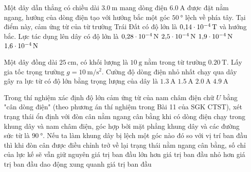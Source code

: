 \begin{ex}
	Một dây dẫn thẳng có chiều dài $\SI{3.0}{\meter}$ mang dòng điện $\SI{6.0}{\ampere}$ được đặt nằm ngang, hướng của dòng điện tạo với hướng bắc một góc $\SI{50}{\degree}$ lệch về phía tây. Tại điểm này, cảm ứng từ của từ trường Trái Đất có độ lớn là $\SI{0.14E-4}{\tesla}$ và hướng bắc. Lực tác dụng lên dây có độ lớn là
	\choice
	{$\SI{0.28E-4}{\newton}$}
	{$\SI{2.5E-4}{\newton}$}
	{$\SI{1.9E-4}{\newton}$}
	{\True $\SI{1.6E-4}{\newton}$}
\end{ex}
\begin{ex}
	Một dây đồng dài $\SI{25}{\centi\meter}$, có khối lượng là $\SI{10}{\gram}$ nằm trong từ trường $\SI{0.20}{\tesla}$. Lấy gia tốc trọng trường $g=\SI{10}{\meter/\second^2}$. Cường độ dòng điện nhỏ nhất chạy qua dây gây ra lực từ có độ lớn bằng trọng lượng của dây là
	\choice
	{$\SI{1.3}{\ampere}$}
	{$\SI{1.5}{\ampere}$}
	{\True $\SI{2.0}{\ampere}$}
	{$\SI{4.9}{\ampere}$}
\end{ex}
\begin{ex}
	Trong thí nghiệm xác định độ lớn cảm ứng từ của nam châm điện chữ $U$ bằng "cân dòng điện" (theo phương án thí nghiệm trong Bài 11 của SGK CTST), xét trạng thái ổn định với đòn cân nằm ngang cân bằng khi có dòng điện chạy trong khung dây và nam châm điện, góc hợp bởi mặt phẳng khung dây và các đường sức từ là $\SI{90}{\degree}$. Nếu ta làm khung dây bị lệch một góc nào đó so với vị trí ban đầu thì khi đòn cân được điều chỉnh trở về lại trạng thái nằm ngang cân bằng, số chỉ của lực kế sẽ	
	\choice
	{vẫn giữ nguyên giá trị ban đầu}
	{lớn hơn giá trị ban đầu}
	{\True nhỏ hơn giá trị ban đầu}
	{dao động xung quanh giá trị ban đầu}
\end{ex}


